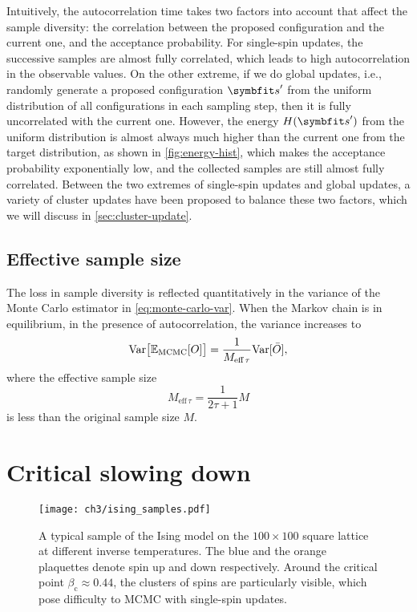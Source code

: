 Intuitively, the autocorrelation time takes two factors into account that affect the sample diversity: the correlation between the proposed configuration and the current one, and the acceptance probability. For single-spin updates, the successive samples are almost fully correlated, which leads to high autocorrelation in the observable values. On the other extreme, if we do global updates, i.e., randomly generate a proposed configuration $\vs'$ from the uniform distribution of all configurations in each sampling step, then it is fully uncorrelated with the current one. However, the energy $H(\vs')$ from the uniform distribution is almost always much higher than the current one from the target distribution, as shown in \cref{fig:energy-hist}, which makes the acceptance probability exponentially low, and the collected samples are still almost fully correlated. Between the two extremes of single-spin updates and global updates, a variety of cluster updates have been proposed to balance these two factors, which we will discuss in \cref{sec:cluster-update}.

\subsection{Effective sample size}

The loss in sample diversity is reflected quantitatively in the variance of the Monte Carlo estimator in \cref{eq:monte-carlo-var}. When the Markov chain is in equilibrium, in the presence of autocorrelation, the variance increases to
\begin{equation}
\mathrm{Var}\big[ \mathbb{E}_\text{MCMC}[O] \big] = \frac{1}{M_{\text{eff}\,\tau}} \mathrm{Var}[\bar{O}],
\end{equation}
where the effective sample size
\begin{equation}
M_{\text{eff}\,\tau} = \frac{1}{2 \tau + 1} M
\label{eq:eff-sample-size}
\end{equation}
is less than the original sample size $M$.

\section{Critical slowing down}
\label{sec:critical-slow}

\begin{figure}[htb]
\centering
\texttt{[image: ch3/ising\_samples.pdf]}
\caption[Sample of Ising model at different temperatures]{
A typical sample of the Ising model on the $100 \times 100$ square lattice at different inverse temperatures. The blue and the orange plaquettes denote spin up and down respectively. Around the critical point $\beta_\text{c} \approx 0.44$, the clusters of spins are particularly visible, which pose difficulty to MCMC with single-spin updates.
}
\label{fig:ising-samples}
\end{figure}

